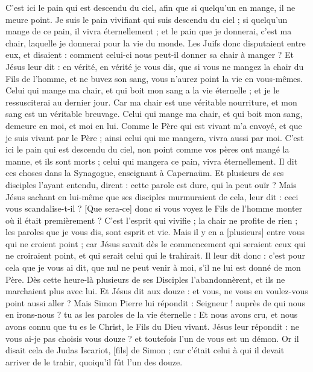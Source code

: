 \begin{multicols}{2}
C'est ici le pain qui est descendu du ciel, afin que si quelqu'un en mange, il ne meure point.
Je suis le pain vivifiant qui suis descendu du ciel ; si quelqu'un mange de ce pain, il vivra éternellement ; et le pain que je donnerai, c'est ma chair, laquelle je donnerai pour la vie du monde.
Les Juifs donc disputaient entre eux, et disaient : comment celui-ci nous peut-il donner sa chair à manger ?
Et Jésus leur dit : en vérité, en vérité je vous dis, que si vous ne mangez la chair du Fils de l'homme, et ne buvez son sang, vous n'aurez point la vie en vous-mêmes.
Celui qui mange ma chair, et qui boit mon sang a la vie éternelle ; et je le ressusciterai au dernier jour.
Car ma chair est une véritable nourriture, et mon sang est un véritable breuvage.
Celui qui mange ma chair, et qui boit mon sang, demeure en moi, et moi en lui.
Comme le Père qui est vivant m'a envoyé, et que je suis vivant par le Père ; ainsi celui qui me mangera, vivra aussi par moi.
C'est ici le pain qui est descendu du ciel, non point comme vos pères ont mangé la manne, et ils sont morts ; celui qui mangera ce pain, vivra éternellement.
Il dit ces choses dans la Synagogue, enseignant à Capernaüm.
Et plusieurs de ses disciples l'ayant entendu, dirent : cette parole est dure, qui la peut ouïr ?
Mais Jésus sachant en lui-même que ses disciples murmuraient de cela, leur dit : ceci vous scandalise-t-il ?
[Que sera-ce] donc si vous voyez le Fils de l'homme monter où il était premièrement ?
C'est l'esprit qui vivifie ; la chair ne profite de rien ; les paroles que je vous dis, sont esprit et vie.
Mais il y en a [plusieurs] entre vous qui ne croient point ; car Jésus savait dès le commencement qui seraient ceux qui ne croiraient point, et qui serait celui qui le trahirait.
Il leur dit donc : c'est pour cela que je vous ai dit, que nul ne peut venir à moi, s'il ne lui est donné de mon Père.
Dès cette heure-là plusieurs de ses Disciples l'abandonnèrent, et ils ne marchaient plus avec lui.
Et Jésus dit aux douze : et vous, ne vous en voulez-vous point aussi aller ?
Mais Simon Pierre lui répondit : Seigneur ! auprès de qui nous en irons-nous ? tu as les paroles de la vie éternelle :
Et nous avons cru, et nous avons connu que tu es le Christ, le Fils du Dieu vivant.
Jésus leur répondit : ne vous ai-je pas choisis vous douze ? et toutefois l'un de vous est un démon.
Or il disait cela de Judas Iscariot, [fils] de Simon ; car c'était celui à qui il devait arriver de le trahir, quoiqu'il fût l'un des douze.

\end{multicols}
